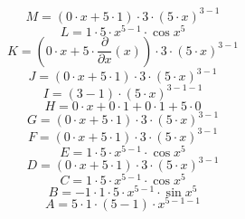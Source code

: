 \documentclass[12pt]{article}
\begin{document}
\begin{equation}
	M = 
\left( 0\cdot x + 5\cdot 1\right) \cdot 3\cdot \left( 5\cdot x\right) ^{3 - 1}
\end{equation}
\begin{equation}
	L = 
1\cdot 5\cdot x^{5 - 1}\cdot \cos {x^{5}}
\end{equation}
\begin{equation}
	K = 
\left( 0\cdot x + 5\cdot \frac{\partial}{\partial x}\left( x\right) \right) \cdot 3\cdot \left( 5\cdot x\right) ^{3 - 1}
\end{equation}
\begin{equation}
	J = 
\left( 0\cdot x + 5\cdot 1\right) \cdot 3\cdot \left( 5\cdot x\right) ^{3 - 1}
\end{equation}
\begin{equation}
	I = 
\left( 3 - 1\right) \cdot \left( 5\cdot x\right) ^{3 - 1 - 1}
\end{equation}
\begin{equation}
	H = 
0\cdot x + 0\cdot 1 + 0\cdot 1 + 5\cdot 0
\end{equation}
\begin{equation}
	G = 
\left( 0\cdot x + 5\cdot 1\right) \cdot 3\cdot \left( 5\cdot x\right) ^{3 - 1}
\end{equation}
\begin{equation}
	F = 
\left( 0\cdot x + 5\cdot 1\right) \cdot 3\cdot \left( 5\cdot x\right) ^{3 - 1}
\end{equation}
\begin{equation}
	E = 
1\cdot 5\cdot x^{5 - 1}\cdot \cos {x^{5}}
\end{equation}
\begin{equation}
	D = 
\left( 0\cdot x + 5\cdot 1\right) \cdot 3\cdot \left( 5\cdot x\right) ^{3 - 1}
\end{equation}
\begin{equation}
	C = 
1\cdot 5\cdot x^{5 - 1}\cdot \cos {x^{5}}
\end{equation}
\begin{equation}
	B = 
-1\cdot 1\cdot 5\cdot x^{5 - 1}\cdot \sin {x^{5}}
\end{equation}
\begin{equation}
	A = 
5\cdot 1\cdot \left( 5 - 1\right) \cdot x^{5 - 1 - 1}
\end{equation}
\end{document}
